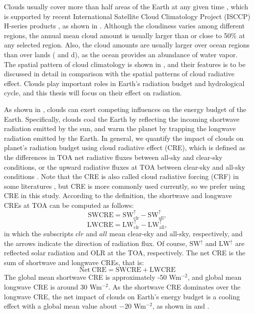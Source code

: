 Clouds usually cover more than half areas of the Earth at any given time \citep{Houze2014,Ramanathan1989}, which is supported by recent International Satellite Cloud Climatology Project (ISCCP) H-series products \citep{Young2018}, as shown in . Although the cloudiness varies among different regions, the annual mean cloud amount is usually larger than or close to 50\% at any selected region. Also, the cloud amounts are usually larger over ocean regions than over lands ( and d), as the ocean provides an abundance of water vapor. The spatial pattern of cloud climatology is shown in , and their features is to be discussed in detail in comparison with the spatial patterns of cloud radiative effect. Clouds play important roles in Earth's radiation budget and hydrological cycle, and this thesis will focus on their effect on radiation.

As shown in , clouds can exert competing influences on the energy budget of the Earth. Specifically, clouds cool the Earth by reflecting the incoming shortwave radiation emitted by the sun, and warm the planet by trapping the longwave radiation emitted by the Earth. In general, we quantify the impact of clouds on planet's radiation budget using cloud radiative effect  (CRE), which is defined as the differences in TOA net radiative fluxes between all-sky and clear-sky conditions, or the upward radiative fluxes at TOA between clear-sky and all-sky conditions \citep[e.g.,][]{Ramanathan1989,Soden2004,Soden2008,Li2017}. Note that the CRE is also called cloud radiative forcing (CRF) in some literatures \citep[e.g.,][]{Ramanathan1989}, but CRE is more commonly used currently, so we prefer using CRE in this study. According to the definition, the shortwave and longwave CREs at TOA can be computed as follows:
\begin{equation}
    \mathrm{SWCRE} = \mathrm{SW}_{\mathrm{clr}}^{\uparrow} - \mathrm{SW}_{\mathrm{all}}^{\uparrow},
    \label{eq:swcre}
\end{equation}
\begin{equation}
    \mathrm{LWCRE} = \mathrm{LW}_{\mathrm{clr}}^{\uparrow} - \mathrm{LW}_{\mathrm{all}}^{\uparrow},
    \label{eq:lwcre}
\end{equation}
in which the subscripts $clr$ and $all$ mean clear-sky and all-sky, respectively, and the arrows indicate the direction of radiation flux. Of course, $\mathrm{SW}^{\uparrow}$ and $\mathrm{LW}^{\uparrow}$ are reflected solar radiation and OLR at the TOA, respectively. The net CRE is the sum of shortwave and longwave CREs, that is:
\begin{equation}
    \mathrm{Net~CRE} = \mathrm{SWCRE} + \mathrm{LWCRE}
    \label{eq:net_cre}
\end{equation}
The global mean shortwave CRE is approximately -50 Wm$^{-2}$, and global mean longwave CRE is around 30 Wm$^{-2}$. As the shortwave CRE dominates over the longwave CRE, the net impact of clouds on Earth's energy budget is a cooling effect with a global mean value about $-20$ Wm$^{-2}$, as shown in  and .

